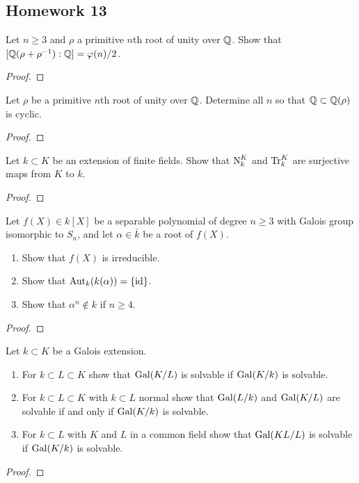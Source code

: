 \subsection{Homework 13}
\begin{problem}
Let $n\geq 3$ and $\rho$ a primitive $n$th root of unity over $\mathbb{Q}$. Show
that $[\mathbb{Q}(\rho+\rho^{-1}):\mathbb{Q}]=\varphi(n)/2$.
\end{problem}
\begin{proof}
\end{proof}

\begin{problem}
Let $\rho$ be a primitive $n$th root of unity over $\mathbb{Q}$. Determine all
$n$ so that $\mathbb{Q}\subset\mathbb{Q}(\rho)$ is cyclic.
\end{problem}
\begin{proof}
\end{proof}

\begin{problem}
Let $k\subset K$ be an extension of finite fields. Show that $\operatorname{N}_k^K$ and
$\operatorname{Tr}_k^K$ are surjective maps from $K$ to $k$.
\end{problem}
\begin{proof}
\end{proof}

\begin{problem}
Let $f(X)\in k[X]$ be a separable polynomial of degree $n\geq 3$ with
Galois group isomorphic to $S_n$, and let $\alpha\in\bar k$ be a root of
$f(X)$.
\begin{enumerate}[label=(\alph*),noitemsep]
\item Show that $f(X)$ is irreducible.
\item Show that $\operatorname{Aut}_k(k(\alpha))=\{\operatorname{id}\}$.
\item Show that $\alpha^n\notin k$ if $n\geq 4$.
\end{enumerate}
\end{problem}
\begin{proof}
\end{proof}

\begin{problem}
Let $k\subset K$ be a Galois extension.
\begin{enumerate}[label=(\alph*),noitemsep]
\item For $k\subset L\subset K$ show that $\operatorname{Gal}(K/L)$ is solvable if
  $\operatorname{Gal}(K/k)$ is solvable.
\item For $k\subset L\subset K$ with $k\subset L$ normal show that
  $\operatorname{Gal}(L/k)$ and $\operatorname{Gal}(K/L)$ are solvable if and only if $\operatorname{Gal}(K/k)$ is
  solvable.
\item For $k\subset L$ with $K$ and $L$ in a common field show that
  $\operatorname{Gal}(KL/L)$ is solvable if $\operatorname{Gal}(K/k)$ is solvable.
\end{enumerate}
\end{problem}
\begin{proof}
\end{proof}

